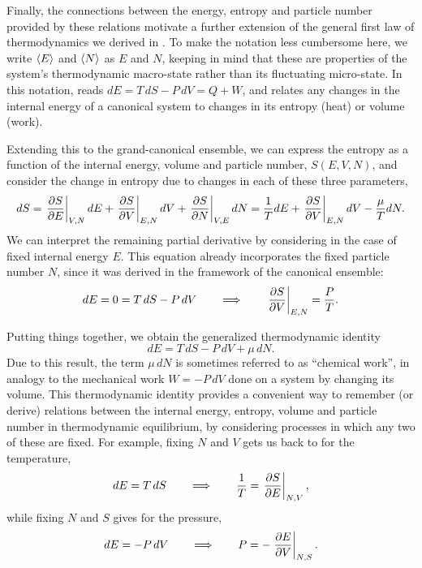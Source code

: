 Finally, the connections between the energy, entropy and particle number provided by these relations motivate a further extension of the general first law of thermodynamics we derived in .
To make the notation less cumbersome here, we write $\left\langle E \right\rangle$ and $\left\langle N \right\rangle$ as $E$ and $N$, keeping in mind that these are properties of the system's thermodynamic macro-state rather than its fluctuating micro-state.
In this notation,  reads $dE = T \, dS - P \, dV = Q + W$, and relates any changes in the internal energy of a canonical system to changes in its entropy (heat) or volume (work).

Extending this to the grand-canonical ensemble, we can express the entropy as a function of the internal energy, volume and particle number, $S(E, V, N)$, and consider the change in entropy due to changes in each of these three parameters,
\begin{equation*}
  dS = \left.\frac{\partial S}{\partial E}\right|_{V, N} dE + \left.\frac{\partial S}{\partial V}\right|_{E, N} dV + \left.\frac{\partial S}{\partial N}\right|_{V, E} dN = \frac{1}{T} dE + \left.\frac{\partial S}{\partial V}\right|_{E, N} dV - \frac{\mu}{T} dN.
\end{equation*}
We can interpret the remaining partial derivative by considering  in the case of fixed internal energy $E$.
This equation already incorporates the fixed particle number $N$, since it was derived in the framework of the canonical ensemble:
\begin{equation*}
  dE = 0 = T \, dS - P \, dV \qquad \Longrightarrow \qquad \left.\frac{\partial S}{\partial V}\right|_{E, N} = \frac{P}{T}.
\end{equation*}

Putting things together, we obtain the generalized thermodynamic identity
\begin{equation}
  \label{eq:thermo_ident}
  dE = T \, dS - P \, dV + \mu \, dN.
\end{equation}
Due to this result, the term $\mu \, dN$ is sometimes referred to as ``chemical work'', in analogy to the mechanical work $W = - P \, dV$ done on a system by changing its volume.
This thermodynamic identity provides a convenient way to remember (or derive) relations between the internal energy, entropy, volume and particle number in thermodynamic equilibrium, by considering processes in which any two of these are fixed.
For example, fixing $N$ and $V$ gets us back to  for the temperature,
\begin{equation*}
  dE = T \, dS \qquad \Longrightarrow \qquad \frac{1}{T} = \left.\frac{\partial S}{\partial E}\right|_{N, V},
\end{equation*}
while fixing $N$ and $S$ gives  for the pressure,
\begin{equation*}
  dE = -P \, dV \qquad \Longrightarrow \qquad P = -\left.\frac{\partial E}{\partial V}\right|_{N, S}.
\end{equation*}

